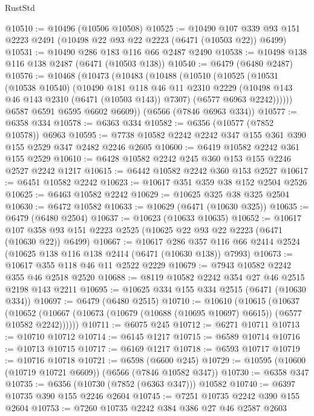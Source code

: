\begin{lexlean}{RustStd}
\begin{coremodule}
@10510 := @10496 (@10506 @10508)
@10525 := @10490
    @107
    @339
    @93
    @151
    @2223
    @2491
    (@10498 @22 @93 @22 @2223 (@6471 (@10503 @22)) @6499)
@10531 := @10490 @286 @183 @116 @66 @2487 @2490
@10538 := @10498 @138 @116 @138 @2487 (@6471 (@10503 @138))
@10540 := @6479 (@6480 @2487)
@10576 := @10468
    (@10473
      (@10483
        (@10488
          (@10510
            (@10525
              (@10531
                (@10538 @10540)
                (@10490
                  @181
                  @118
                  @46
                  @11
                  @2310
                  @2229
                  (@10498 @143 @46 @143 @2310 (@6471 (@10503 @143)) @7307)
                  (@6577 @6963 @2242))))))
        @6587
        @6591
        @6595
        @6602
        @6609))
    (@6566 (@7846 @6963 @334))
@10577 := @6358 @334
@10578 := @6363 @334
@10582 := @6356 (@10577 (@7852 @10578)) @6963
@10595 := @7738 @10582 @2242 @2242 @347 @155 @361 @390 @155 @2529 @347 @2482 @2246 @2605
@10600 := @6419 @10582 @2242 @361 @155 @2529
@10610 := @6428 @10582 @2242 @245 @360 @153 @155 @2246 @2527 @2242 @1217
@10615 := @6442 @10582 @2242 @360 @153 @2527
@10617 := @6451 @10582 @2242
@10623 := @10617 @351 @359 @38 @152 @2504 @2526
@10625 := @6463 @10582 @2242
@10629 := @10625 @325 @38 @325 @2504
@10630 := @6472 @10582
@10633 := @10629 (@6471 (@10630 @325))
@10635 := @6479 (@6480 @2504)
@10637 := @10623 (@10633 @10635)
@10652 := @10617
    @107
    @358
    @93
    @151
    @2223
    @2525
    (@10625 @22 @93 @22 @2223 (@6471 (@10630 @22)) @6499)
@10667 := @10617
    @286
    @357
    @116
    @66
    @2414
    @2524
    (@10625 @138 @116 @138 @2414 (@6471 (@10630 @138)) @7993)
@10673 := @10617 @355 @118 @46 @11 @2522 @2229
@10679 := @7943 @10582 @2242 @355 @46 @2518 @2520
@10688 := @8119 @10582 @2242 @354 @27 @46 @2515 @2198 @143 @2211
@10695 := @10625 @334 @155 @334 @2515 (@6471 (@10630 @334))
@10697 := @6479 (@6480 @2515)
@10710 := @10610
    (@10615
      (@10637
        (@10652 (@10667 (@10673 (@10679 (@10688 (@10695 @10697) @6615)) (@6577 @10582 @2242))))))
@10711 := @6075 @245
@10712 := @6271 @10711
@10713 := @10710 @10712
@10714 := @6145 @1217
@10715 := @6589 @10714
@10716 := @10713 @10715
@10717 := @6169 @1217
@10718 := @6593 @10717
@10719 := @10716 @10718
@10721 := @6598 (@6600 @245)
@10729 := @10595 (@10600 (@10719 @10721 @6609)) (@6566 (@7846 @10582 @347))
@10730 := @6358 @347
@10735 := @6356 (@10730 (@7852 (@6363 @347))) @10582
@10740 := @6397 @10735 @390 @155 @2246 @2604
@10745 := @7251 @10735 @2242 @390 @155 @2604
@10753 := @7260 @10735 @2242 @384 @386 @27 @46 @2587 @2603

\end{coremodule}
\end{lexlean}
